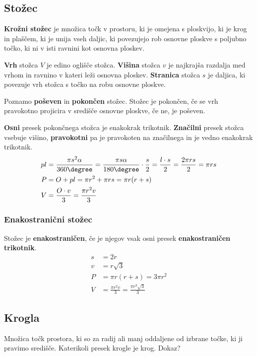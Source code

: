 \documentclass[a4paper,oneside,12pt,fleqn]{article}
\newcommand\krat\cdot
\def\deg{\degree}
\numberwithin{equation}{section}
\begin{document}
\subsection{Stožec}
\label{sec:tel:stoz}
\textbf{Krožni stožec} je množica točk v prostoru, ki je omejena s ploskvijo, ki je krog
in plaščem, ki je unija vseh daljic, ki povezujejo rob osnovne ploskve s poljubno
točko, ki ni v isti ravnini kot osnovna ploskev.

\textbf{Vrh} stožca $V$ je edino oglišče stožca. \textbf{Višina} stožca $v$ je najkrajša razdalja med vrhom
in ravnino v kateri leži osnovna ploskev. \textbf{Stranica} stožca $s$ je daljica, ki povezuje vrh
stožca s točko na robu osnovne ploskve.

Poznamo \textbf{poševen} in \textbf{pokončen} stožec. Stožec je pokončen, če se vrh
pravokotno projicira v središče osnovne ploskve, če ne, je poševen.

\textbf{Osni} presek pokončnega stožca je enakokrak trikotnik.
\textbf{Značilni} presek stožca vsebuje višino, \textbf{pravokotni} pa je pravokoten na značilnega in je
vedno enakokrak trikotnik.
\begin{align*}
  pl &= \frac{\pi s^2\alpha}{360\deg} = \frac{\pi s\alpha}{180\deg} \krat
  \frac{s}{2} = \frac{l \krat s}{2} = \frac{2\pi rs}{2} = \pi rs \\
  P &= O + pl = \pi r^2 + \pi rs = \pi r(r+s) \\
  V &= \frac{O\krat v}{3} = \frac{\pi r^2v}{3}
\end{align*}

\subsubsection{Enakostranični stožec}
\label{sec:tel:stoz:enak}
Stožec je \textbf{enakostraničen}, če je njegov vsak osni
presek \textbf{enakostraničen trikotnik}.
\begin{align*}
  s &= 2r \\
  v &= r\sqrt{3} \\
  P &= \pi r(r+s) = 3\pi r^2 \\
  V &= \frac{\pi r^2v}{3} = \frac{\pi r^3\sqrt{3}}{3}
\end{align*}

\subsection{Krogla}
\label{sec:tel:krog}
Množica točk prostora, ki so za radij ali manj oddaljene od izbrane točke, ki ji pravimo
središče. Katerikoli presek krogle je krog. Dokaz?
\end{document}
